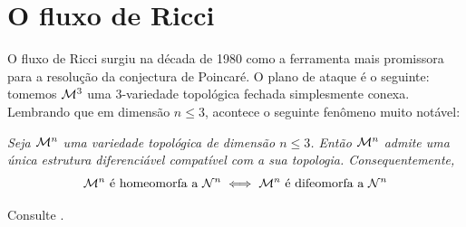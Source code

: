 




\thispagestyle{empty}




 














\pagestyle{fancy}
\renewcommand{\footrulewidth}{0pt}
\fancyhf{}
  \renewcommand\footrule{%

 \color{BlueViolet}\noindent\makebox[\linewidth]{\rule{\paperwidth}{1pt}}
}

\renewcommand{\headrulewidth}{0pt}

        \section{O fluxo de Ricci}
        O fluxo de Ricci surgiu na década de 1980 como a ferramenta mais promissora para a resolução da conjectura de Poincaré. O plano de ataque é o seguinte: tomemos $\mathcal{M}^3$ uma $3$-variedade topológica fechada simplesmente conexa. Lembrando que em dimensão $n \leq 3$, acontece o seguinte fenômeno muito notável:
\begin{lema}
\textit{Seja $\mathcal{M}^n$ uma variedade topológica de dimensão $n \leq 3$. Então $\mathcal{M}^n$ admite uma única estrutura diferenciável compatível com a sua topologia. Consequentemente, 
\[
\mathcal{M}^n \text{ é homeomorfa a } \mathcal{N}^n  \iff \mathcal{M}^n \text{ é difeomorfa a }  \mathcal{N}^n 
\]
}
\end{lema}
\begin{demm}
Consulte .
\end{demm}





